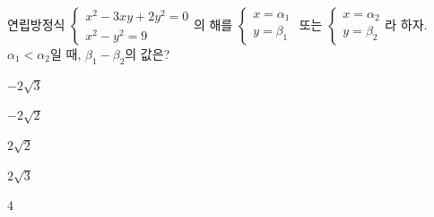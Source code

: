 연립방정식 $\begin{cases} x^2-3xy+2y^2=0 \\ x^2-y^2=9 \end{cases}$의 해를 $\begin{cases} x=\alpha_1 \\ y=\beta_1 \end{cases}$ 또는 $\begin{cases} x=\alpha_2 \\ y=\beta_2 \end{cases}$라 하자. $\alpha_1<\alpha_2$일 때, $\beta_1-\beta_2$의 값은?
\begin{choices32}{\rule[-3ex]{0pt}{8ex}$-2\sqrt{3}$}{\rule[-3ex]{0pt}{8ex}$-2\sqrt{2}$}{\rule[-3ex]{0pt}{8ex}$2\sqrt{2}$}{\rule[-3ex]{0pt}{8ex}$2\sqrt{3}$}{\rule[-3ex]{0pt}{8ex}$4$}\end{choices32}
